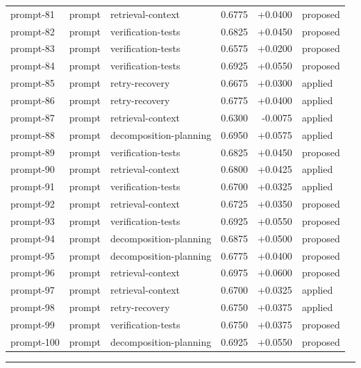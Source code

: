 \begin{center}
\begin{longtable}{llp{5.2cm}rrl}
prompt-81 & prompt & retrieval-context & 0.6775 & +0.0400 & proposed \\
prompt-82 & prompt & verification-tests & 0.6825 & +0.0450 & proposed \\
prompt-83 & prompt & verification-tests & 0.6575 & +0.0200 & proposed \\
prompt-84 & prompt & verification-tests & 0.6925 & +0.0550 & proposed \\
prompt-85 & prompt & retry-recovery & 0.6675 & +0.0300 & applied \\
prompt-86 & prompt & retry-recovery & 0.6775 & +0.0400 & applied \\
prompt-87 & prompt & retrieval-context & 0.6300 & -0.0075 & applied \\
prompt-88 & prompt & decomposition-planning & 0.6950 & +0.0575 & applied \\
prompt-89 & prompt & verification-tests & 0.6825 & +0.0450 & proposed \\
prompt-90 & prompt & retrieval-context & 0.6800 & +0.0425 & applied \\
prompt-91 & prompt & verification-tests & 0.6700 & +0.0325 & applied \\
prompt-92 & prompt & retrieval-context & 0.6725 & +0.0350 & proposed \\
prompt-93 & prompt & verification-tests & 0.6925 & +0.0550 & proposed \\
prompt-94 & prompt & decomposition-planning & 0.6875 & +0.0500 & proposed \\
prompt-95 & prompt & decomposition-planning & 0.6775 & +0.0400 & proposed \\
prompt-96 & prompt & retrieval-context & 0.6975 & +0.0600 & proposed \\
prompt-97 & prompt & retrieval-context & 0.6700 & +0.0325 & applied \\
prompt-98 & prompt & retry-recovery & 0.6750 & +0.0375 & applied \\
prompt-99 & prompt & verification-tests & 0.6750 & +0.0375 & proposed \\
prompt-100 & prompt & decomposition-planning & 0.6925 & +0.0550 & proposed \\
\bottomrule\end{longtable}\end{center}
\par\bigskip\hrule\bigskip
